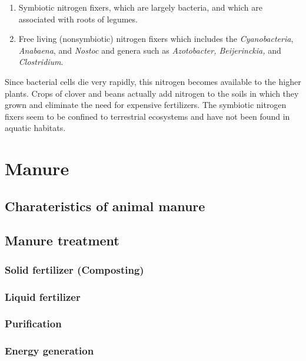 \documentclass[]{book}
\begin{document}
\begin{enumerate}
\def\labelenumi{\arabic{enumi}.}
\item
  Symbiotic nitrogen fixers, which are largely bacteria, and which are
  associated with roots of legumes.
\item
  Free living (nonsymbiotic) nitrogen fixers which includes the
  \emph{Cyanobacteria}, \emph{Anabaena}, and \emph{Nostoc} and genera
  such as \emph{Azotobacter, Beijerinckia,} and \emph{Clostridium}.
\end{enumerate}

Since bacterial cells die very rapidly, this nitrogen becomes available
to the higher plants. Crops of clover and beans actually add nitrogen to
the soils in which they grown and eliminate the need for expensive
fertilizers. The symbiotic nitrogen fixers seem to be confined to
terrestrial ecosystems and have not been found in aquatic habitats.

\chapter{Manure}\label{manure}

\section{Charateristics of animal
manure}\label{charateristics-of-animal-manure}

\section{Manure treatment}\label{manure-treatment}

\subsection{Solid fertilizer
(Composting)}\label{solid-fertilizer-composting}

\subsection{Liquid fertilizer}\label{liquid-fertilizer}

\subsection{Purification}\label{purification}

\subsection{Energy generation}\label{energy-generation}
\end{document}
